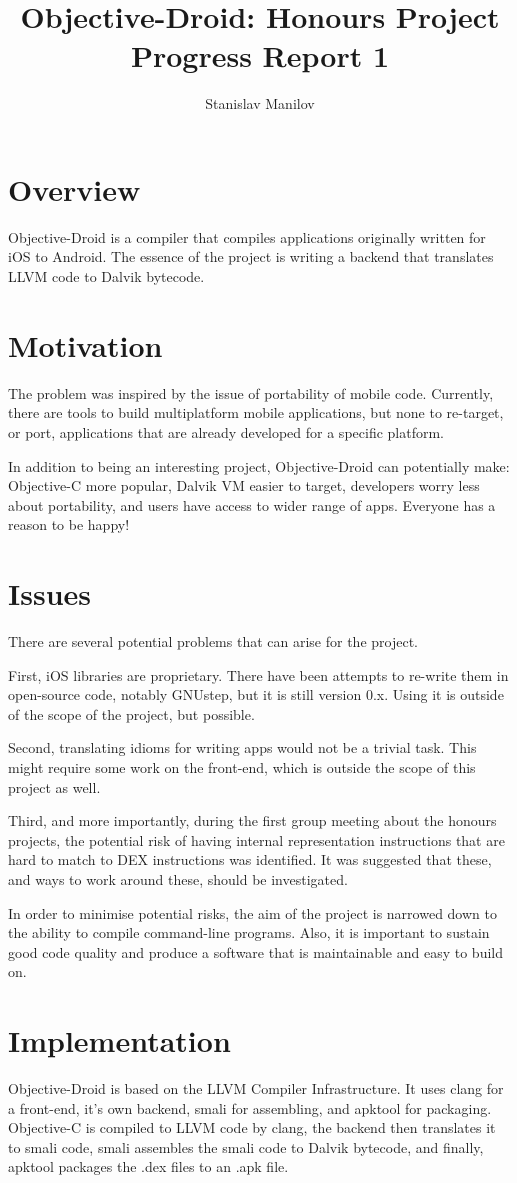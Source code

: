 \documentclass[a4paper,11pt]{article}
\author{Stanislav Manilov}
\title{Objective-Droid: Honours Project Progress Report 1}
\begin{document}
\maketitle
\section{Overview}
Objective-Droid is a compiler that compiles applications originally written
for iOS to Android. The essence of the project is writing a backend that
translates LLVM code to Dalvik bytecode.
\section{Motivation}
The problem was inspired by the issue of portability of mobile code.
Currently, there are tools to build multiplatform mobile applications, but
none to re-target, or port, applications that are already developed for a
specific platform.

In addition to being an interesting project, Objective-Droid can
potentially make: Objective-C more popular, Dalvik VM easier to target,
developers worry less about portability, and users have access to wider range
of apps. Everyone has a reason to be happy!
\section{Issues}
There are several potential problems that can arise for the project. 

First, iOS libraries are proprietary. There have been attempts to re-write them
in open-source code, notably GNUstep, but it is still version 0.x. Using it is
outside of the scope of the project, but possible.

Second, translating idioms for writing apps would not be a trivial task. This might
require some work on the front-end, which is outside the scope of this project as
well.

Third, and more importantly, during the first group meeting about the
honours projects, the potential risk of having internal representation
instructions that are hard to match to DEX instructions was identified. It was
suggested that these, and ways to work around these, should be investigated.

In order to minimise potential risks, the aim of the project is narrowed down
to the ability to compile command-line programs. Also, it is important to
sustain good code quality and produce a software that is maintainable and easy
to build on.
\section{Implementation}
Objective-Droid is based on the LLVM Compiler Infrastructure. It uses clang
for a front-end, it's own backend, smali for assembling, and apktool for
packaging. Objective-C is compiled to LLVM code by clang, the backend then
translates it to smali code, smali assembles the smali code to Dalvik
bytecode, and finally, apktool packages the .dex files to an .apk file.
\end{document}
